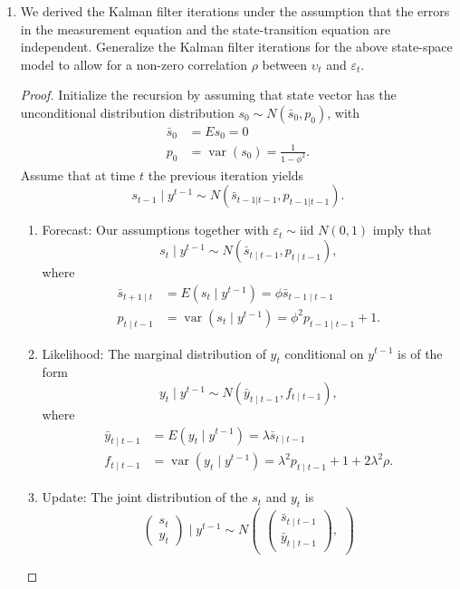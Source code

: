 \documentclass[oneside,reqno]{amsart}
\DeclareMathOperator{\var}{var}
\newcommand{\eps}{\varepsilon}
\newcommand{\ups}{\upsilon}
\theoremstyle{definition}
\begin{document}
\begin{enumerate}
\item
We derived the Kalman filter iterations under the assumption that the errors in the measurement equation and the state-transition equation are independent. Generalize the Kalman filter iterations for the above state-space model to allow for a non-zero correlation $\rho$ between $\ups_t$ and $\eps_t$. 

\begin{proof}
Initialize the recursion by assuming that state vector has the unconditional distribution distribution $s_0 \sim N(\bar s_0, p_0)$, with 
\begin{align*}
	\bar s_0 &= E s_0 = 0 \\
	p_0 &= \var(s_0) = \frac{1}{1-\phi^2}. 
\end{align*}
Assume that at time $t$ the previous iteration yields 
\[	
	s_{t-1} \mid y^{t-1} \sim N(\bar s_{t-1|t-1}, p_{t-1|t-1}).
\]
\begin{enumerate}[label=(\arabic*)]
\item
Forecast: Our assumptions together with $\eps_t \sim \text{iid } N(0,1)$ imply that 
\[
	s_t \mid y^{t-1} \sim N(\bar s_{t\mid t-1}, p_{t\mid t-1}),
\] 
where 
\begin{align*}
	\bar s_{t+1 \mid t} &= E(s_t \mid y^{t-1}) 
		= \phi \bar s_{t-1\mid t-1} \\
	 p_{t \mid t-1} &= \var(s_t \mid y^{t-1}) 
	 	= \phi^2  p_{t-1 \mid t-1}  + 1.
\end{align*}
\item
Likelihood: The marginal distribution of $y_t$ conditional on $y^{t-1}$ is of the form 
\[
	y_t \mid y^{t-1} \sim N(\bar y_{t \mid t-1}, f_{t\mid t-1}),
\] 
where 
\begin{align*}
	\bar y_{t \mid t-1} &= E(y_t \mid y^{t-1})
		 = \lambda \bar s_{t \mid t-1} \\
	 f_{t \mid t-1} &= \var(y_t \mid y^{t-1}) 
	 	= \lambda^2 p_{t \mid t-1} +1 + 2 \lambda^2 \rho.
\end{align*}
\item
Update: The joint distribution of the $s_t$ and $y_t$ is 
\[
	\begin{pmatrix}
		s_t \\ y_t 
	\end{pmatrix}
	\mid y^{t-1} \sim N
	\begin{pmatrix}
		\begin{pmatrix}
			\bar s_{t\mid t-1}  \\ 
			\bar y_{t \mid t-1} 
		\end{pmatrix},

\end{pmatrix}\]
\end{enumerate}
\end{proof}
\end{enumerate}
\end{document}
